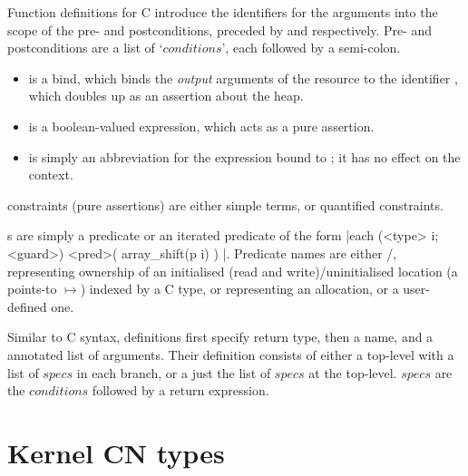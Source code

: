 Function definitions for C introduce the identifiers for the arguments into the
scope of the pre- and postconditions, preceded by  and
 respectively. Pre- and postconditions are a list of
`${conditions}$', each followed by a semi-colon.
\begin{itemize}
    \item {} is a  bind, which binds
        the \emph{output} arguments of the resource to the identifier ,
        which doubles up as an assertion about the heap.
    \item {} is a boolean-valued expression, which acts as a
        pure assertion.
    \item {} is simply an abbreviation for the expression
         bound to ; it has no effect on the context.
\end{itemize}

 constraints (pure assertions) are either simple terms, or quantified
constraints.

 s are simply a predicate  %
or an iterated predicate of the form
\cninline[breaklines]|each (<type> i; <guard>) { <pred>( array_shift(p i) ) }|. %
Predicate names  are either
/, representing ownership of an
initialised (read and write)/uninitialised location (a points-to $\mapsto{}$)
indexed by a C type, or  representing an allocation, or a
user-defined one.

Similar to C syntax,   definitions first specify return
type, then a name, and a  annotated list of arguments. Their
definition consists of either a top-level  with a list of ${specs}$
in each branch, or a just the list of ${specs}$ at the top-level. ${specs}$ are
the ${conditions}$ followed by a return expression.

\section{Kernel CN types}

